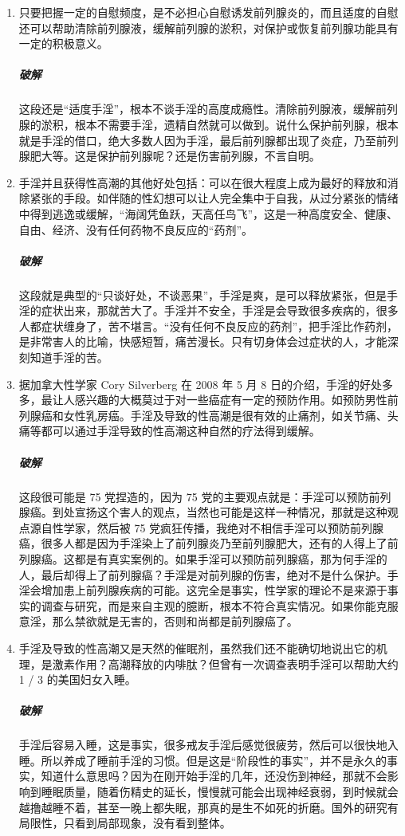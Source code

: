\documentclass{ctexart}
\begin{document}
\begin{enumerate}
    \item 只要把握一定的自慰频度，是不必担心自慰诱发前列腺炎的，而且适度的自慰还可以帮助清除前列腺液，缓解前列腺的淤积，对保护或恢复前列腺功能具有一定的积极意义。
    \subparagraph{破解} 这段还是“适度手淫”，根本不谈手淫的高度成瘾性。清除前列腺液，缓解前列腺的淤积，根本不需要手淫，遗精自然就可以做到。说什么保护前列腺，根本就是手淫的借口，绝大多数人因为手淫，最后前列腺都出现了炎症，乃至前列腺肥大等。这是保护前列腺呢？还是伤害前列腺，不言自明。
    \item 手淫并且获得性高潮的其他好处包括：可以在很大程度上成为最好的释放和消除紧张的手段。如伴随的性幻想可以让人完全集中于自我，从过分紧张的情绪中得到逃逸或缓解，“海阔凭鱼跃，天高任鸟飞”，这是一种高度安全、健康、自由、经济、没有任何药物不良反应的“药剂”。
    \subparagraph{破解} 这段就是典型的“只谈好处，不谈恶果”，手淫是爽，是可以释放紧张，但是手淫的症状出来，那就苦大了。手淫并不安全，手淫是会导致很多疾病的，很多人都症状缠身了，苦不堪言。“没有任何不良反应的药剂”，把手淫比作药剂，是非常害人的比喻，快感短暂，痛苦漫长。只有切身体会过症状的人，才能深刻知道手淫的苦。
    \item 据加拿大性学家 Cory Silverberg 在 2008 年 5 月 8 日的介绍，手淫的好处多多，最让人感兴趣的大概莫过于对一些癌症有一定的预防作用。如预防男性前列腺癌和女性乳房癌。手淫及导致的性高潮是很有效的止痛剂，如关节痛、头痛等都可以通过手淫导致的性高潮这种自然的疗法得到缓解。
    \subparagraph{破解} 这段很可能是 75 党捏造的，因为 75 党的主要观点就是：手淫可以预防前列腺癌。到处宣扬这个害人的观点，当然也可能是这样一种情况，那就是这种观点源自性学家，然后被 75 党疯狂传播，我绝对不相信手淫可以预防前列腺癌，很多人都是因为手淫染上了前列腺炎乃至前列腺肥大，还有的人得上了前列腺癌。这都是有真实案例的。如果手淫可以预防前列腺癌，那为何手淫的人，最后却得上了前列腺癌？手淫是对前列腺的伤害，绝对不是什么保护。手淫会增加患上前列腺疾病的可能。这完全是事实，性学家的理论不是来源于事实的调查与研究，而是来自主观的臆断，根本不符合真实情况。如果你能克服意淫，那么禁欲就是无害的，否则和尚都是前列腺癌了。
    \item 手淫及导致的性高潮又是天然的催眠剂，虽然我们还不能确切地说出它的机理，是激素作用？高潮释放的内啡肽？但曾有一次调查表明手淫可以帮助大约 1 / 3 的美国妇女入睡。
    \subparagraph{破解} 手淫后容易入睡，这是事实，很多戒友手淫后感觉很疲劳，然后可以很快地入睡。所以养成了睡前手淫的习惯。但是这是“阶段性的事实”，并不是永久的事实，知道什么意思吗？因为在刚开始手淫的几年，还没伤到神经，那就不会影响到睡眠质量，随着伤精史的延长，慢慢就可能会出现神经衰弱，到时候就会越撸越睡不着，甚至一晚上都失眠，那真的是生不如死的折磨。国外的研究有局限性，只看到局部现象，没有看到整体。

\end{enumerate}
\end{document}
